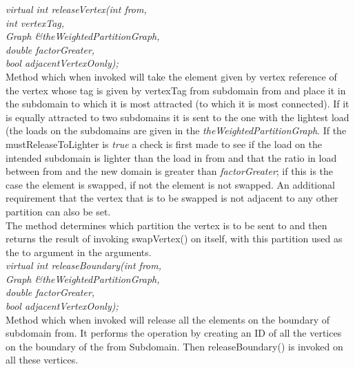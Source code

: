 {\em virtual int releaseVertex(int from, \\
\indent\indent\indent\indent\indent int vertexTag, \\
\indent\indent\indent\indent\indent Graph \&theWeightedPartitionGraph, \\
\indent\indent\indent\indent\indent double factorGreater, \\
\indent\indent\indent\indent\indent bool adjacentVertexOonly); } \\
Method which when invoked will take the element given by vertex
reference of the vertex whose tag is given by \p vertexTag from
subdomain \p from and place it in the subdomain to which it is most
attracted (to which it is most connected). If it is equally attracted
to two subdomains it is sent to the one with the lightest load (the
loads on the subdomains are given in the {\em
theWeightedPartitionGraph}. If the \p mustReleaseToLighter is {\em
true} a check is first made to see if the load on the intended
subdomain is lighter than the load in \p from and that the ratio in
load between from and the new domain is greater than {\em
factorGreater}; if this is the case the element is swapped, if not the
element is not swapped. An additional requirement that the vertex that
is to be swapped is not adjacent to any other partition can also be
set. \\ 
The method determines which partition the vertex is to be sent to and
then returns the result of invoking swapVertex() on itself, with
this partition used as the \p to argument in the arguments. \\

{\em virtual int releaseBoundary(int from, \\
\indent\indent\indent\indent\indent Graph \&theWeightedPartitionGraph, \\
\indent\indent\indent\indent\indent double factorGreater, \\
\indent\indent\indent\indent\indent bool adjacentVertexOonly); } \\
Method which when invoked will release all the elements on the
boundary of subdomain \p from. It performs the operation by
creating an ID of all the vertices on the boundary of the \p from
Subdomain. Then releaseBoundary() is invoked on all these vertices. \\


